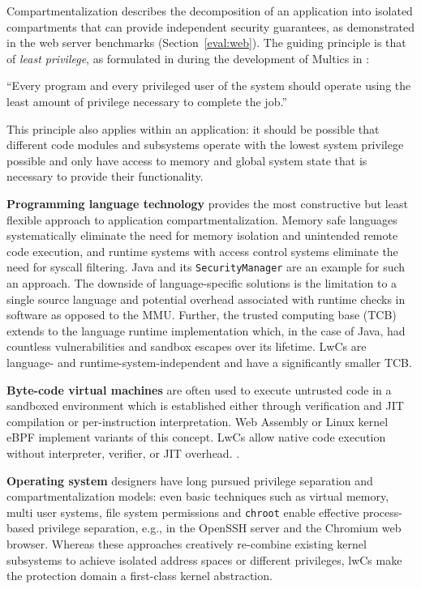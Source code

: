 \documentclass[10pt,twocolumn,a4paper]{article}
\begin{document}
Compartmentalization describes the decomposition of an application into isolated compartments that can provide independent security guarantees, as demonstrated in the web server benchmarks (Section~\ref{eval:web}).
The guiding principle is that of \textit{least privilege}, as formulated in during the development of Multics in \citeyear{principleofleastprivilege}:%
\begin{displayquote}
\enquote{Every program and every privileged user of the system should operate using the least amount of privilege necessary to complete the job.}
\cite{principleofleastprivilege}
\end{displayquote}
This principle also applies within an application: it should be possible that different code modules and subsystems operate with the lowest system privilege possible and only have access to memory and global system state that is necessary to provide their functionality.

\textbf{Programming language technology} provides the most constructive but least flexible approach to application compartmentalization.
Memory safe languages systematically eliminate the need for memory isolation and unintended remote code execution, and runtime systems with access control systems eliminate the need for syscall filtering.
Java and its \lstinline{SecurityManager} are an example for such an approach.
The downside of language-specific solutions is the limitation to a single source language and potential overhead associated with runtime checks in software as opposed to the MMU.
Further, the trusted computing base (TCB) extends to the language runtime implementation which, in the case of Java, had countless vulnerabilities and sandbox escapes over its lifetime.
LwCs are language- and runtime-system-independent and have a significantly smaller TCB.
\cite{javasecurity,bartel2018twentyyearsjavasecuritysandboxescape}

\textbf{Byte-code virtual machines} are often used to execute untrusted code in a sandboxed environment
which is established either through verification and JIT compilation or per-instruction interpretation.
Web Assembly or Linux kernel eBPF implement variants of this concept.
LwCs allow native code execution without interpreter, verifier, or JIT overhead.
\cite{haas2017bringingwebassembly, lwnebpf}.

\textbf{Operating system} designers have long pursued privilege separation and compartmentalization models:
even basic techniques such as virtual memory, multi user systems, file system permissions and \lstinline{chroot} enable effective process-based privilege separation, e.g., in the OpenSSH server and the Chromium web browser.
Whereas these approaches creatively re-combine existing kernel subsystems to achieve isolated address spaces or different privileges, lwCs make the protection domain a first-class kernel abstraction.
\cite{provos2003preventing, barth2008security}
\end{document}
